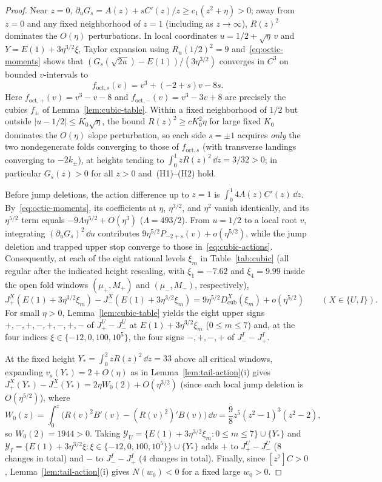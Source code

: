 \begin{proof}
Near $z=0$, $\partial_u G_s=A(z)+sC'(z)/z\ge c_1(z^2+\eta)>0$; away from $z=0$ and any fixed neighborhood of $z=1$ (including as $z\to\infty$), $R(z)^2$ dominates the $O(\eta)$ perturbations. In local coordinates $u=1/2+\sqrt\eta\,v$ and $Y=E(1)+3\eta^{3/2}\xi$, Taylor expansion using $R_u(1/2)^2=9$ and~\eqref{eq:octic-moments} shows that $(G_s(\sqrt{2u})-E(1))/(3\eta^{3/2})$ converges in $C^3$ on bounded $v$-intervals to
\[
  f_{\mathrm{oct},s}(v) = v^3 + (-2+s)v - 8s.
\]
Here $f_{\mathrm{oct},+}(v)=v^3-v-8$ and $f_{\mathrm{oct},-}(v)=v^3-3v+8$ are precisely the cubics $f_\pm$ of Lemma~\ref{lem:cubic-table}. Within a fixed neighborhood of $1/2$ but outside $|u-1/2|\le K_0\sqrt\eta$, the bound $R(z)^2\ge cK_0^2\eta$ for large fixed $K_0$ dominates the $O(\eta)$ slope perturbation, so each side $s=\pm 1$ acquires \emph{only} the two nondegenerate folds converging to those of $f_{\mathrm{oct},s}$ (with transverse landings converging to $-2k_\pm$), at heights tending to $\int_0^1 zR(z)^2\,\dd z=3/32>0$; in particular $G_s(z)>0$ for all $z>0$ and~(H1)--(H2) hold.

Before jump deletions, the action difference up to $z=1$ is $\int_0^1 4A(z)C'(z)\,\dd z$. By~\eqref{eq:octic-moments}, its coefficients at $\eta$, $\eta^{3/2}$, and $\eta^2$ vanish identically, and its $\eta^{5/2}$ term equals $-9\Lambda\eta^{5/2}+O(\eta^3)$ ($\Lambda=493/2$). From $u=1/2$ to a local root $v$, integrating $(\partial_u G_s)^2\,\dd u$ contributes $9\eta^{5/2}P_{-2+s}(v)+o(\eta^{5/2})$, while the jump deletion and trapped upper stop converge to those in~\eqref{eq:cubic-actions}. Consequently, at each of the eight rational levels $\xi_m$ in Table~\ref{tab:cubic} (all regular after the indicated height rescaling, with $\xi_1=-7.62$ and $\xi_4=9.99$ inside the open fold windows $(\mu_+,M_+)$ and $(\mu_-,M_-)$, respectively),
\[
  J_+^X(E(1)+3\eta^{3/2}\xi_m) - J_-^X(E(1)+3\eta^{3/2}\xi_m) = 9\eta^{5/2} D_{\mathrm{cub}}^X(\xi_m) + o(\eta^{5/2})\qquad (X\in\{U,I\}).
\]
For small $\eta>0$, Lemma~\ref{lem:cubic-table} yields the eight upper signs $+,-,+,-,+,-,+,-$ of $J_+^U-J_-^U$ at $E(1)+3\eta^{3/2}\xi_m$ ($0\le m\le 7$) and, at the four indices $\xi\in\{-12,0,100,10^5\}$, the four signs $-,+,-,+$ of $J_-^I-J_+^I$.

At the fixed height $Y_*=\int_0^2 zR(z)^2\,\dd z=33$ above all critical windows, expanding $v_s(Y_*)=2+O(\eta)$ as in Lemma~\ref{lem:tail-action}(i) gives $J_+^X(Y_*)-J_-^X(Y_*)=2\eta W_0(2)+O(\eta^{3/2})$ (since each local jump deletion is $O(\eta^{5/2})$), where
\[
  W_0(z) = \int_0^z\big(R(v)^2 B'(v) - (R(v)^2)' B(v)\big)\,\dd v = \frac{9}{8}z^5(z^2-1)^3(z^2-2),
\]
so $W_0(2)=1944>0$. Taking $\mathcal{Y}_U=\{E(1)+3\eta^{3/2}\xi_m:0\le m\le 7\}\cup\{Y_*\}$ and $\mathcal{Y}_I=\{E(1)+3\eta^{3/2}\xi: \xi\in\{-12,0,100,10^5\}\}\cup\{Y_*\}$ adds $+$ to $J_+^U-J_-^U$ ($8$ changes in total) and $-$ to $J_-^I-J_+^I$ ($4$ changes in total). Finally, since $[z^7]C>0$, Lemma~\ref{lem:tail-action}(i) gives $N(w_0)<0$ for a fixed large $w_0>0$.
\end{proof}
